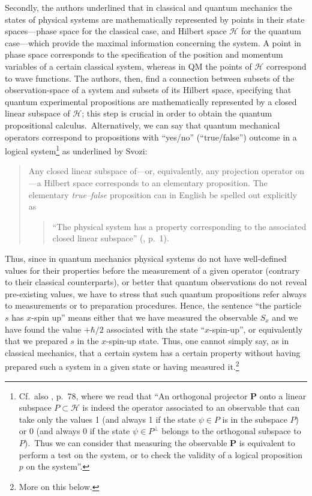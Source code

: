 \documentclass[11pt, executivepaper]{article}
\begin{document}
Secondly, the authors underlined that in classical and quantum mechanics the states of physical systems are mathematically represented by points in their state spaces---phase space for the classical case, and Hilbert space $\mathcal{H}$ for the quantum case---which provide the maximal information concerning the system. A point in phase space corresponds to the specification of the position and momentum variables of a certain classical system, whereas in QM the points of $\mathcal{H}$ correspond to wave functions. The authors, then, find a connection between subsets of the observation-space of a system and subsets of its Hilbert space, specifying that quantum experimental propositions are mathematically represented by a closed linear subspace of $\mathcal{H}$; this step is crucial in order to obtain the quantum propositional calculus.\ Alternatively, we can say that quantum mechanical operators correspond to propositions with ``yes/no'' (``true/false'') outcome in a logical system\footnote{Cf.\ also \cite{David:2015}, p.\ 78, where we read that ``An orthogonal projector $\textbf{P}$ onto a linear subspace $P\subset\mathcal{H}$ is indeed the operator associated to an observable that can take only the values 1 (and always 1 if the state $\psi\in P$ is in the subspace $P$) or 0 (and always 0 if the state $\psi\in P^{\perp}$ belongs to the orthogonal subspace to $P$).\ Thus we can consider that measuring the observable $\textbf{P}$ is equivalent to perform a test on the system, or to check the validity of a logical proposition $p$ on the system''.} as underlined by Svozi:
\begin{quote}
Any closed linear subspace of---or, equivalently, any projection operator on---a Hilbert space corresponds to an elementary
proposition. The elementary \emph{true--false} proposition can in English be spelled out explicitly as
\begin{quote}
``The physical system has a property corresponding to the associated closed linear subspace'' (\cite{Svozi:1999}, p.\ 1).
\end{quote}
\end{quote}

Thus, since in quantum mechanics physical systems do not have well-defined values for their properties before the measurement of a given operator (contrary to their classical counterparts), or better that quantum observations do not reveal pre-existing values, we have to stress that such quantum propositions refer always to measurements or to preparation procedures. Hence, the sentence ``the particle $s$ has $x$-spin up'' means either that we have measured the observable $S_x$ and we have found the value $+\hbar/2$ associated with the state ``$x$-spin-up'', or equivalently that we prepared $s$ in the $x$-spin-up state. Thus, one cannot simply say, as in classical mechanics, that a certain system has a certain property without having prepared such a system in a given state or having measured it.\footnote{More on this below.}
\end{document}
